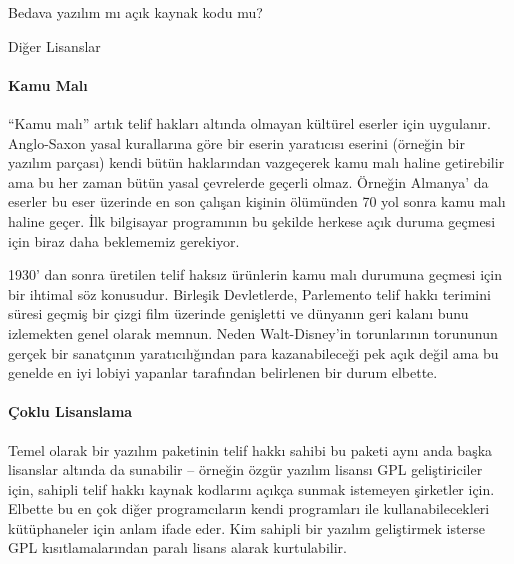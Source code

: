 \begin{section}{Bedava yazılım mı açık kaynak kodu mu?}
\begin{subsection}{Diğer Lisanslar}
\paragraph{Kamu Malı}{“Kamu malı” artık telif hakları altında olmayan kültürel eserler için uygulanır. Anglo-Saxon yasal kurallarına göre bir eserin yaratıcısı eserini (örneğin bir yazılım parçası) kendi bütün haklarından vazgeçerek kamu malı haline getirebilir ama bu her zaman bütün yasal çevrelerde geçerli olmaz. Örneğin Almanya' da eserler bu eser üzerinde en son çalışan kişinin ölümünden 70 yol sonra kamu malı haline geçer. İlk bilgisayar programının bu şekilde herkese açık duruma geçmesi için biraz daha beklememiz gerekiyor.}

1930' dan sonra üretilen telif haksız ürünlerin kamu malı durumuna geçmesi için bir ihtimal söz konusudur. Birleşik Devletlerde, Parlemento telif hakkı terimini süresi geçmiş bir çizgi film üzerinde genişletti ve dünyanın geri kalanı bunu izlemekten genel olarak memnun. Neden Walt-Disney'in torunlarının torununun gerçek bir sanatçının yaratıcılığından para kazanabileceği pek açık değil ama bu genelde en iyi lobiyi yapanlar tarafından belirlenen bir durum elbette.

\paragraph{Çoklu Lisanslama}{Temel olarak bir yazılım paketinin telif hakkı sahibi bu paketi aynı anda başka lisanslar altında da sunabilir – örneğin özgür yazılım lisansı GPL geliştiriciler için, sahipli telif hakkı kaynak kodlarını açıkça sunmak istemeyen şirketler için. Elbette bu en çok diğer programcıların kendi programları ile kullanabilecekleri kütüphaneler için anlam ifade eder. Kim sahipli bir yazılım geliştirmek isterse GPL kısıtlamalarından paralı lisans alarak kurtulabilir.}

\end{subsection}
\end{section}
